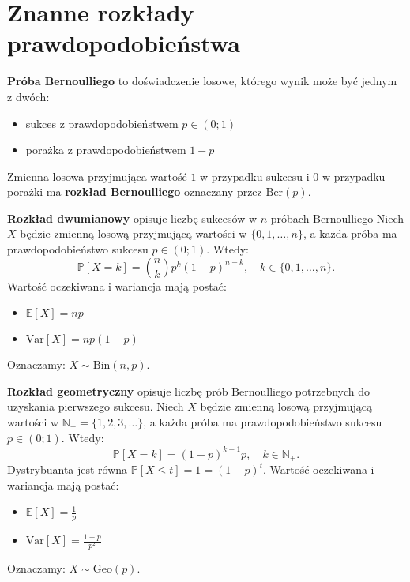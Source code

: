 \section{Znanne rozkłady prawdopodobieństwa}

\begin{definition}
\textbf{Próba Bernoulliego} to doświadczenie losowe, którego wynik może być jednym z dwóch:
\begin{itemize}
    \item sukces z prawdopodobieństwem  $p \in (0;1)$
    \item porażka z prawdopodobieństwem  $1 - p$
\end{itemize}  

Zmienna losowa przyjmująca wartość $1$ w przypadku sukcesu i $0$ w przypadku porażki ma \textbf{rozkład Bernoulliego} oznaczany przez $\mathrm{Ber}(p)$.
\end{definition}

\begin{definition}
\textbf{Rozkład dwumianowy} opisuje liczbę sukcesów w $n$ próbach Bernoulliego
Niech $X$ będzie zmienną losową przyjmującą wartości w $\{0,1,\dots,n\}$, a każda próba ma prawdopodobieństwo sukcesu $p \in (0;1)$.  
Wtedy:
\[
\mathbb{P}[X = k] = \binom{n}{k}p^k(1-p)^{n-k}, \quad k \in \{0,1,\dots,n\}.
\]
Wartość oczekiwana i wariancja mają postać:
\begin{itemize}
    \item $\mathbb{E}[X] = np$
    \item $\mathrm{Var}[X] = np(1-p)$
\end{itemize} 
Oznaczamy: $X \sim \mathrm{Bin}(n,p)$.
\end{definition}

\begin{definition}
\textbf{Rozkład geometryczny} opisuje liczbę prób Bernoulliego potrzebnych do uzyskania pierwszego sukcesu.  
Niech $X$ będzie zmienną losową przyjmującą wartości w $\mathbb{N}_+ = \{1,2,3,\dots\}$, a każda próba ma prawdopodobieństwo sukcesu $p \in (0;1)$.  
Wtedy:
\[
\mathbb{P}[X = k] = (1 - p)^{k-1} p, \quad k \in \mathbb{N}_+.
\]
Dystrybuanta jest równa $\mathbb{P}[X\le t] = 1 = (1-p)^t$.
Wartość oczekiwana i wariancja mają postać:
\begin{itemize}
    \item $\mathbb{E}[X] = \frac{1}{p}$
    \item $\mathrm{Var}[X] = \frac{1 - p}{p^2}$
\end{itemize}  
Oznaczamy: $X \sim \mathrm{Geo}(p)$.
\end{definition}


